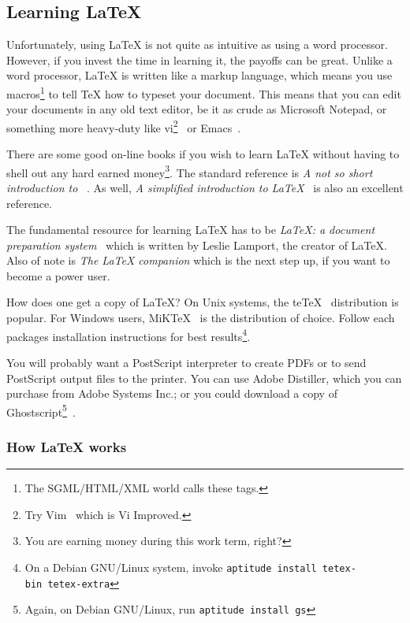 \documentclass{uw-wkrpt}
\begin{document}
\subsection{Learning \LaTeX}
\newcommand{\us}{\hspace{-0.1ex}}
\newcommand{\teTeX}{\mbox{t\us e\us\us\TeX}}
\newcommand{\MiKTeX}{\mbox{M\us i\us K\us\us\TeX}}
%
Unfortunately, using \LaTeX{} is not quite as intuitive as using a
word processor.  However, if you invest the time in learning it, the
payoffs can be great.  Unlike a word processor, \LaTeX{} is written
like a markup language, which means you use macros\footnote{The 
SGML/HTML/XML world calls these tags.} to tell \TeX{} how to typeset
your document.  This means that you can edit your documents in any
old text editor, be it as crude as Microsoft Notepad, or something
more heavy-duty like vi\footnote{Try Vim~\cite{ref:vim} which is 
Vi Improved.}~\cite{ref:vi} or Emacs~\cite{ref:emacs}.

There are some good on-line books if you wish to learn \LaTeX{} without
having to shell out any hard earned money\footnote{You are earning money
during this work term, right?}.  The standard reference is \textit{A
not so short introduction to \LaTeXe{}}~\cite{ref:short}.  As well,
\textit{A simplified introduction to \LaTeX}~\cite{ref:simplified} is
also an excellent reference.

The fundamental resource for learning \LaTeX{} has to be \textit{\LaTeX:
a document preparation system}~\cite{ref:latex2e} which is written by
Leslie Lamport, the creator of \LaTeX.  Also of note is \textit{The
\LaTeX{} companion} which is the next step up, if you want to become a
power user.

How does one get a copy of \LaTeX?  On Unix systems, the 
\teTeX~\cite{ref:tetex} distribution is popular.  For Windows users,
\MiKTeX~\cite{ref:miktex} is the distribution of choice.  Follow each
packages installation instructions for best results\footnote{On a Debian
GNU/Linux system, invoke \texttt{aptitude~install~tetex-bin~tetex-extra}}.

You will probably want a PostScript interpreter to create PDFs or to
send PostScript output files to the printer.  You can use Adobe Distiller,
which you can purchase from Adobe Systems Inc.; or you could download
a copy of Ghostscript\footnote{Again, on Debian GNU/Linux, run
\texttt{aptitude~install~gs}}~\cite{ref:gs}.

\subsubsection{How \LaTeX{} works}
\end{document}
